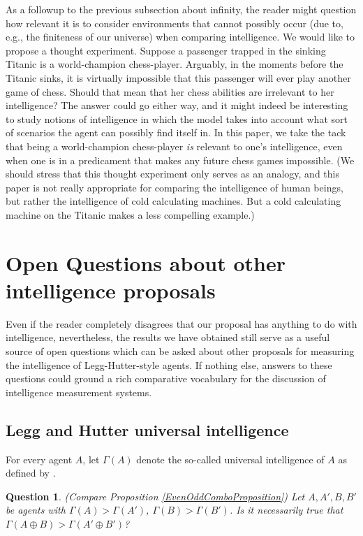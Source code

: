 \documentclass[twoside,11pt]{article}
\newtheorem{question}[theorem]{Question}
\begin{document}
As a followup to the previous subsection about infinity, the reader might
question how relevant it is to consider environments that cannot possibly occur
(due to, e.g., the finiteness of our universe) when comparing intelligence.
We would like to propose a thought experiment. Suppose a passenger
trapped in the sinking Titanic is a world-champion chess-player. Arguably,
in the moments before the Titanic sinks, it is virtually impossible that this
passenger will ever play another game of chess. Should that mean
that her chess abilities are irrelevant to her intelligence? The answer could
go either way, and it might indeed be interesting to study notions of intelligence
in which the model takes into account what sort of scenarios the agent can
possibly find itself in. In this paper, we take the tack that being a world-champion
chess-player \emph{is} relevant to one's intelligence, even when one is in a
predicament that makes any future chess games impossible. (We should stress that
this thought experiment only serves as an analogy, and this paper is not really
appropriate for comparing the intelligence of human beings, but rather the
intelligence of cold calculating machines. But a cold calculating machine on the
Titanic makes a less compelling example.)

\section{Open Questions about other intelligence proposals}
\label{openquestionsection}

Even if the reader completely disagrees that our proposal has anything to do with
intelligence, nevertheless, the results we have obtained still serve as
a useful source of open questions which can be asked about other proposals for
measuring the intelligence of Legg-Hutter-style agents.
If nothing else, answers to these questions could ground a rich comparative
vocabulary for the discussion of intelligence measurement systems.


\subsection{Legg and Hutter universal intelligence}

For every agent $A$, let $\varGamma(A)$ denote the so-called universal intelligence of $A$
as defined by \citet{hutter2007}.

\begin{question}
\label{FirstOpenQuestion}
    (Compare Proposition \ref{EvenOddComboProposition})
    Let $A,A',B,B'$ be agents with $\varGamma(A)>\varGamma(A')$,
    $\varGamma(B)>\varGamma(B')$.
    Is it necessarily true that $\varGamma(A\oplus B)>\varGamma(A'\oplus B')$?
\end{question}
\end{document}

